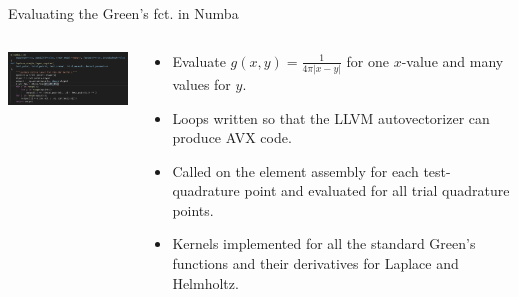 \documentclass[dvipsnames,10pt]{beamer}
\begin{document}
\begin{frame}{Evaluating the Green's fct. in Numba}

\begin{columns}[T]
\begin{column}{.48\textwidth}

\vspace{3cm}

\begin{center}
\includegraphics[width=6cm]{../figs/laplace_kernel_numba.png}
\end{center}
\end{column}%
\hfill%
\begin{column}{.48\textwidth}

\vspace{1cm}

\begin{itemize}
    \item Evaluate $g(x, y)=\frac{1}{4\pi |x - y|}$ for one $x$-value and many values for $y$.
    \item Loops written so that the LLVM autovectorizer can produce AVX code.
    \item Called on the element assembly for each test-quadrature point and evaluated for all trial quadrature points.
    \item Kernels implemented for all the standard Green's functions and their derivatives for Laplace and Helmholtz.
\end{itemize}

\end{column}%
\end{columns}

    
\end{frame}
\end{document}
